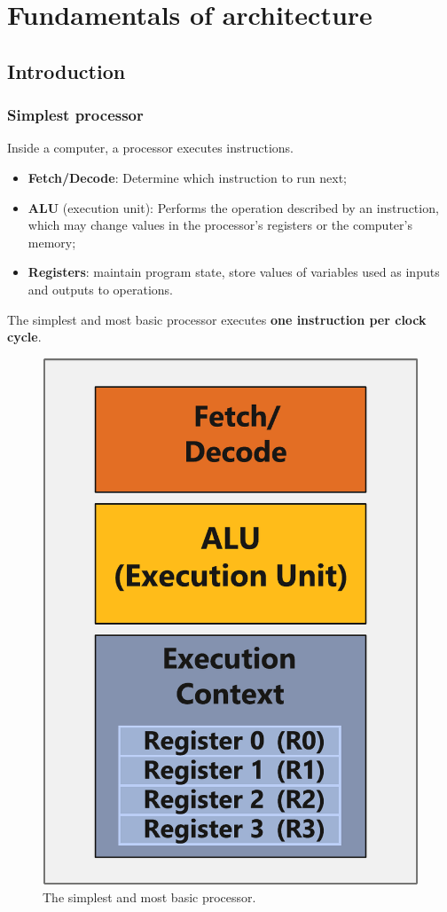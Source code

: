 \section{Fundamentals of architecture}

\subsection{Introduction}

\subsubsection{Simplest processor}

Inside a computer, a processor executes instructions.
\begin{itemize}
    \item \textbf{Fetch/Decode}: Determine which instruction to run next;
    \item \textbf{ALU} (execution unit): Performs the operation described by an instruction, which may change values in the processor's registers or the computer's memory;
    \item \textbf{Registers}: maintain program state, store values of variables used as inputs and outputs to operations.
\end{itemize}
The simplest and most basic processor executes \textbf{one instruction per clock cycle}.
\begin{figure}[!htp]
    \centering
    \includegraphics[width=.3\textwidth]{img/simplest-prcoessor-1.pdf}
    \caption{The simplest and most basic processor.}
\end{figure}

\newpage

